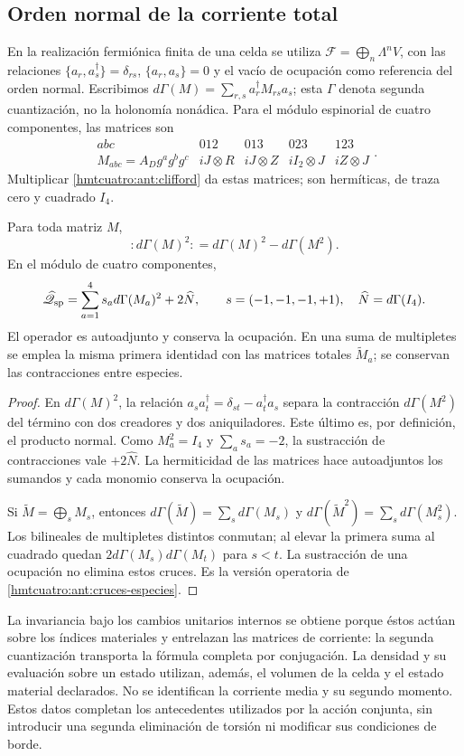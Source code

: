 \subsection{Orden normal de la corriente total}
\label{hmtcuatro:ant:car}

En la realización fermiónica finita de una celda se utiliza
\(\mathcal F=\bigoplus_n\Lambda^n V\), con las relaciones
\(\{a_r,a_s^\dagger\}=\delta_{rs}\), \(\{a_r,a_s\}=0\) y el
vacío de ocupación como referencia del orden normal.
Escribimos \(d\Gamma(M)=\sum_{r,s}a_r^\dagger M_{rs}a_s\);
esta \(\Gamma\) denota segunda cuantización, no la holonomía nonádica.
Para el módulo espinorial de cuatro componentes, las matrices son
\[
 \begin{array}{c|cccc}
 abc&012&013&023&123\\ \hline
 M_{abc}=A_Dg^ag^bg^c&
 iJ\otimes R&iJ\otimes Z&iI_2\otimes J&iZ\otimes J
 \end{array}.
\]
Multiplicar \eqref{hmtcuatro:ant:clifford} da estas matrices;
son hermíticas, de traza cero y cuadrado \(I_4\).

\begin{proposition}
\label{hmtcuatro:ant:orden-normal}
Para toda matriz \(M\),
\[
 :d\Gamma(M)^2:
 =d\Gamma(M)^2-d\Gamma(M^2).
\]
En el módulo de cuatro componentes,
\[
 \widehat{\mathscr Q}_{\rm sp}
 =\sum_{a=1}^4s_a d\Gamma(M_a)^2+2\widehat N,
 \qquad s=(-1,-1,-1,+1),\quad \widehat N=d\Gamma(I_4).
\]
El operador es autoadjunto y conserva la ocupación.
En una suma de multipletes se emplea la misma primera identidad
con las matrices totales \(\widetilde M_a\); se conservan las
contracciones entre especies.
\end{proposition}
\begin{proof}
En \(d\Gamma(M)^2\), la relación
\(a_sa_t^\dagger=\delta_{st}-a_t^\dagger a_s\) separa la
contracción \(d\Gamma(M^2)\) del término con dos creadores y
dos aniquiladores. Este último es, por definición, el producto
normal. Como \(M_a^2=I_4\) y \(\sum_a s_a=-2\), la sustracción
de contracciones vale \(+2\widehat N\). La hermiticidad de las
matrices hace autoadjuntos los sumandos y cada monomio conserva
la ocupación.

Si \(\widetilde M=\bigoplus_s M_s\), entonces
\(d\Gamma(\widetilde M)=\sum_s d\Gamma(M_s)\) y
\(d\Gamma(\widetilde M^2)=\sum_s d\Gamma(M_s^2)\).
Los bilineales de multipletes distintos conmutan; al elevar la
primera suma al cuadrado quedan
\(2d\Gamma(M_s)d\Gamma(M_t)\) para \(s<t\). La sustracción de
una ocupación no elimina estos cruces. Es la versión operatoria
de \eqref{hmtcuatro:ant:cruces-especies}.
\end{proof}

La invariancia bajo los cambios unitarios internos se obtiene
porque éstos actúan sobre los índices materiales y entrelazan las
matrices de corriente: la segunda cuantización transporta la
fórmula completa por conjugación. La densidad y su evaluación
sobre un estado utilizan, además, el volumen de la celda y el
estado material declarados. No se identifican la corriente media
y su segundo momento. Estos datos completan los antecedentes
utilizados por la acción conjunta, sin introducir una segunda
eliminación de torsión ni modificar sus condiciones de borde.
